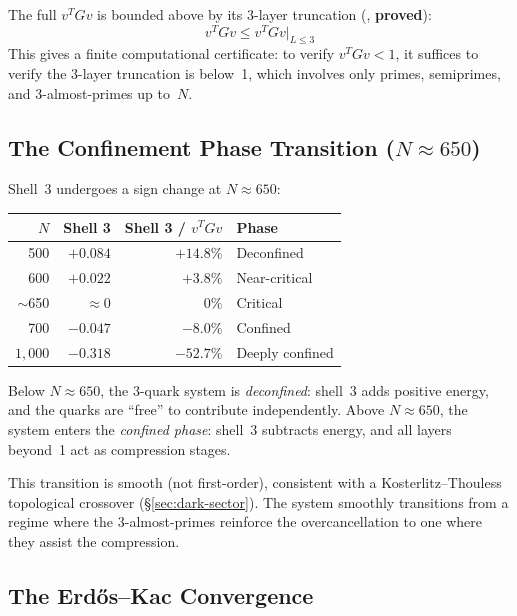 \begin{observation}
The full $v^T G v$ is bounded above by its 3-layer truncation
(, \textbf{proved}):
\[
  v^T G v \leq v^T G v \big|_{L \leq 3}
\]
This gives a finite computational certificate: to verify $v^T G v < 1$,
it suffices to verify the 3-layer truncation is below~1, which involves
only primes, semiprimes, and 3-almost-primes up to~$N$.
\end{observation}

\subsection{The Confinement Phase Transition ($N \approx 650$)}

Shell~3 undergoes a sign change at $N \approx 650$:

\begin{center}
\small
\begin{tabular}{@{}rrrl@{}}
\toprule
$N$ & \textbf{Shell 3} & \textbf{Shell 3 / $v^T G v$} & \textbf{Phase} \\
\midrule
500 & $+0.084$ & $+14.8\%$ & Deconfined \\
600 & $+0.022$ & $+3.8\%$  & Near-critical \\
$\sim$650 & $\approx 0$ & $0\%$ & Critical \\
700 & $-0.047$ & $-8.0\%$  & Confined \\
$1{,}000$ & $-0.318$ & $-52.7\%$ & Deeply confined \\
\bottomrule
\end{tabular}
\end{center}

\begin{correspondence}
Below $N \approx 650$, the 3-quark system is \emph{deconfined}:
shell~3 adds positive energy, and the quarks are ``free'' to
contribute independently. Above $N \approx 650$, the system
enters the \emph{confined phase}: shell~3 subtracts energy,
and all layers beyond~1 act as compression stages.

This transition is smooth (not first-order), consistent with a
Kosterlitz--Thouless topological crossover (\S\ref{sec:dark-sector}).
The system smoothly transitions from a regime where the 3-almost-primes
reinforce the overcancellation to one where they assist the compression.
\end{correspondence}

\subsection{The Erd\H{o}s--Kac Convergence}

